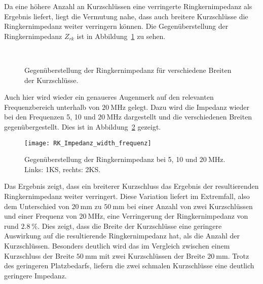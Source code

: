 \newpage



Da eine h\"ohere Anzahl an Kurzschl\"ussen eine verringerte Ringkernimpedanz als Ergebnis liefert, liegt die Vermutung nahe, dass auch breitere Kurzschl\"usse die Ringkernimpedanz weiter verringern k\"onnen. Die Gegen\"uberstellung der Ringkernimpedanz $Z_{rk}$ ist in Abbildung~\ref{fig:ringcorewidth} zu sehen.

\begin{figure}[htb]
	\centering
	\\
	\caption{Gegen\"uberstellung der Ringkernimpedanz f\"ur verschiedene Breiten der Kurzschl\"usse.}
	\label{fig:ringcorewidth}
\end{figure}

Auch hier wird wieder ein genaueres Augenmerk auf den relevanten Frequenzbereich unterhalb von $\SI{20}{\mega\hertz}$ gelegt. Dazu wird die Impedanz wieder bei den Frequenzen 5, 10 und $\SI{20}{\mega\hertz}$ dargestellt und die verschiedenen Breiten gegen\"ubergestellt. Dies ist in Abbildung~\ref{fig:ringcorewidth20} gezeigt.



\newpage



\begin{figure}[h]
	\centering
	\texttt{[image: RK\_Impedanz\_width\_frequenz]}
	\caption{Gegen\"uberstellung der Ringkernimpedanz bei 5, 10 und $\SI{20}{\mega\hertz}$. Links: 1KS, rechts: 2KS.}
	\label{fig:ringcorewidth20}
\end{figure}

Das Ergebnis zeigt, dass ein breiterer Kurzschluss das Ergebnis der resultierenden Ringkernimpedanz weiter verringert. Diese Variation liefert im Extremfall, also dem Unterschied von $\SI{20}{\milli\meter}$ zu $\SI{50}{\milli\meter}$ bei einer Anzahl von zwei Kurzschl\"ussen und einer Frequenz von $\SI{20}{\mega\hertz}$, eine Verringerung der Ringkernimpedanz von rund $\SI{2,8}{\%}$. Dies zeigt, dass die Breite der Kurzschl\"usse eine geringere Auswirkung auf die resultierende Ringkernimpedanz hat, als die Anzahl der Kurzschl\"ussen. Besonders deutlich wird das im Vergleich zwischen einem Kurzschluss der Breite $\SI{50}{\milli\meter}$ mit zwei Kurzschl\"ussen der Breite $\SI{20}{\milli\meter}$. Trotz des geringeren Platzbedarfs, liefern die zwei schmalen Kurzschl\"usse eine deutlich geringere Impedanz.

